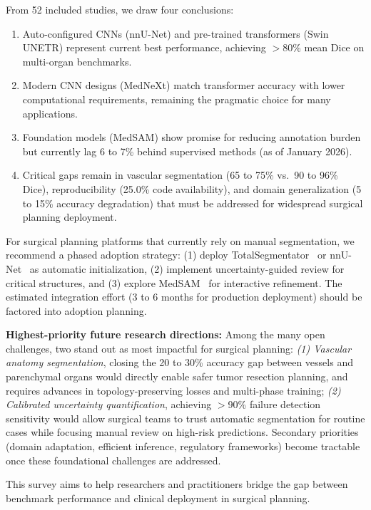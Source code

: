 \documentclass[conference]{IEEEtran}
\begin{document}
From 52 included studies, we draw four conclusions:

\begin{enumerate}
    \item Auto-configured CNNs (nnU-Net) and pre-trained transformers (Swin UNETR) represent current best performance, achieving $>$80\% mean Dice on multi-organ benchmarks.
    
    \item Modern CNN designs (MedNeXt) match transformer accuracy with lower computational requirements, remaining the pragmatic choice for many applications.
    
    \item Foundation models (MedSAM) show promise for reducing annotation burden but currently lag 6 to 7\% behind supervised methods (as of January 2026).
    
    \item Critical gaps remain in vascular segmentation (65 to 75\% vs.\ 90 to 96\% Dice), reproducibility (25.0\% code availability), and domain generalization (5 to 15\% accuracy degradation) that must be addressed for widespread surgical planning deployment.
\end{enumerate}

For surgical planning platforms that currently rely on manual segmentation, we recommend a phased adoption strategy: (1) deploy TotalSegmentator~\cite{wasserthal2023totalsegmentator} or nnU-Net~\cite{isensee2021nnunet} as automatic initialization, (2) implement uncertainty-guided review for critical structures, and (3) explore MedSAM~\cite{ma2024medsam} for interactive refinement. The estimated integration effort (3 to 6 months for production deployment) should be factored into adoption planning.

\textbf{Highest-priority future research directions:} Among the many open challenges, two stand out as most impactful for surgical planning: \emph{(1) Vascular anatomy segmentation}, closing the 20 to 30\% accuracy gap between vessels and parenchymal organs would directly enable safer tumor resection planning, and requires advances in topology-preserving losses and multi-phase training; \emph{(2) Calibrated uncertainty quantification}, achieving $>$90\% failure detection sensitivity would allow surgical teams to trust automatic segmentation for routine cases while focusing manual review on high-risk predictions. Secondary priorities (domain adaptation, efficient inference, regulatory frameworks) become tractable once these foundational challenges are addressed.

This survey aims to help researchers and practitioners bridge the gap between benchmark performance and clinical deployment in surgical planning.




\end{document}
